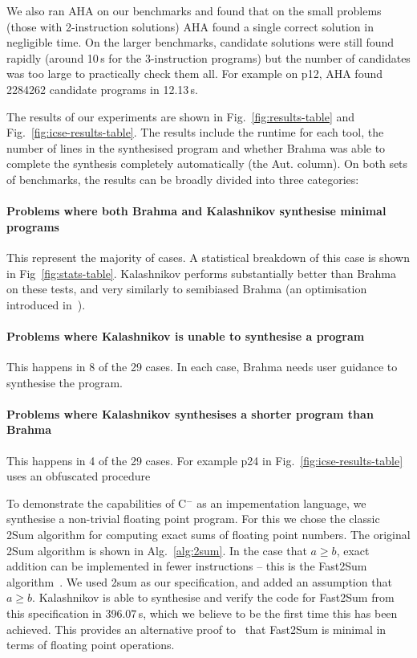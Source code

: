 \documentclass[a4paper]{llncs}
\newcommand{\newC}{C$^-$\xspace}
\begin{document}
We also ran {\sc AHA} on our benchmarks and found that on the small problems (those with 2-instruction solutions)
{\sc AHA} found a single correct solution in negligible time.  On the larger benchmarks, candidate solutions
were still found rapidly (around 10\,s for the 3-instruction programs) but the number of candidates was
too large to practically check them all.  For example on p12, {\sc AHA} found 2284262 candidate
programs in 12.13\,s.

The results of our experiments are shown in Fig.~\ref{fig:results-table} and Fig.~\ref{fig:icse-results-table}.
The results include the runtime for each tool, the number of lines in the synthesised program and whether
{\sc Brahma} was able to complete the synthesis completely automatically (the Aut. column).
On both sets of benchmarks, the results can be broadly divided into three categories:

\paragraph{Problems where both {\sc Brahma} and {\sc Kalashnikov} synthesise minimal programs}
This represent the majority of cases.  A statistical breakdown of this case is shown in Fig~\ref{fig:stats-table}.
{\sc Kalashnikov} performs substantially better than {\sc Brahma} on these tests, and very similarly to
semibiased {\sc Brahma} (an optimisation introduced in~\cite{brahma-icse}).

\paragraph{Problems where {\sc Kalashnikov} is unable to synthesise a program}
This happens in 8 of the 29 cases.  In each case, {\sc Brahma} needs user guidance to synthesise the program.

\paragraph{Problems where {\sc Kalashnikov} synthesises a shorter program than {\sc Brahma}}
This happens in 4 of the 29 cases.  For example p24 in Fig.~\ref{fig:icse-results-table} uses
an obfuscated procedure 


To demonstrate the capabilities of \newC as an impementation language, we synthesise a
non-trivial floating point program.  For this we chose the classic {\sc 2Sum} algorithm for computing
exact sums of floating point numbers.  The original {\sc 2Sum} algorithm is shown in Alg.~\ref{alg:2sum}.
In the case that $a \ge b$, exact addition can be implemented in fewer instructions -- this is the
{\sc Fast2Sum} algorithm~\cite{fast2sum}.  We used {\sc 2sum} as our specification, and
added an assumption that $a \ge b$.  {\sc Kalashnikov} is able to synthesise and verify the
code for {\sc Fast2Sum} from this specification in 396.07\,s, which we believe to be the first time
this has been achieved.  This provides an alternative proof to~\cite{fast2sum} that {\sc Fast2Sum} is
minimal in terms of floating point operations.
\end{document}
